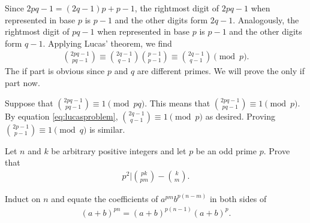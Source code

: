\documentclass[12pt]{subfile}
\begin{document}
	\begin{solution}
		Since $2pq-1 = (2q-1)p+p-1$, the rightmost digit of $2pq-1$ when represented in base $p$ is $p-1$ and the other digits form $2q-1$. Analogously, the rightmost digit of $pq-1$ when represented in base $p$ is $p-1$ and the other digits form $q-1$. Applying Lucas' theorem, we find
			\begin{align}
				\binom{2pq-1}{pq-1}\equiv \binom{2q-1}{q-1} \binom{p-1}{p-1}\equiv \binom{2q-1}{q-1} \pmod p.\label{eq:lucasproblem}
			\end{align}
		The if part is obvious since $p$ and $q$ are different primes. We will prove the only if part now. 
		
		Suppose  that $\binom{2pq-1}{pq-1}\equiv 1\pmod{pq}$. This means that $\binom{2pq-1}{pq-1}\equiv 1\pmod{p}$. By equation \eqref{eq:lucasproblem}, $\binom{2q-1}{q-1} \equiv 1 \pmod p$ as desired. Proving $\binom{2p-1}{p-1}\equiv 1 \pmod q$ is similar.
	\end{solution}
	
	\begin{problem}
		Let $n$ and $k$ be arbitrary positive integers and let $p$ be an odd prime $p$. Prove that 
			\begin{align*}
				p^2 \Big| \binom{pk}{pm} - \binom{k}{m}.
			\end{align*}
	\end{problem}
	
	\begin{hint}
		Induct on $n$ and equate the coefficients of $a^{pm}b^{p(n-m)}$ in both sides of
			\begin{align*}
				(a+b)^{pn}=(a+b)^{p(n-1)}(a+b)^{p}.
			\end{align*}
	\end{hint}
	
	
%		
	
\end{document}
